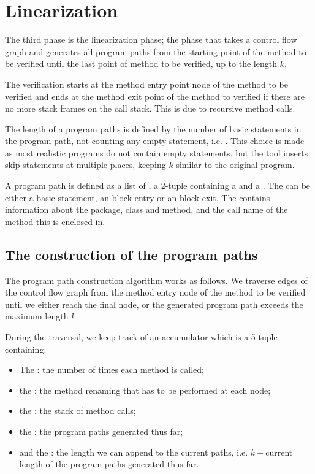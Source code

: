 \section{Linearization}
The third phase is the linearization phase; the phase that takes a control flow 
graph and generates all program paths from the starting point of the method to
be verified until the last point of method to be verified, up to the length $k$.

The verification starts at the method entry point node of the method to be verified
and ends at the method exit point of the method to verified if there are no more 
stack frames on the call stack. This is due to recursive method calls.

The length of a program paths is defined by the number of basic statements in the
program path, not counting any empty statement, i.e. \javainline{;}. This choice
is made as most realistic programs do not contain empty statements, but the tool
inserts skip statements at multiple places, keeping $k$ similar to the original 
program.

A program path is defined as a list of , a 2-tuple 
containing a  and a . The 
 can be either a basic statement, an block entry or an 
block exit. The  contains information about the package,
class and method, and the call name of the method this  is
enclosed in.

\subsection{The construction of the program paths}
The program path construction algorithm works as follows. We traverse edges of
the control flow graph from the method entry node of the method to be verified
until we either reach the final node, or the generated program path exceeds the
maximum length $k$.

During the traversal, we keep track of an accumulator  
which is a 5-tuple containing:

\begin{itemize}
    \item The : the number of times each method is called;
    \item the : the method renaming that has to be
    performed at each node;
    \item the : the stack of method calls;
    \item the : the program paths generated thus far;
    \item and the : the length we can append to the current
    paths, i.e. $k-$current length of the program paths generated thus far. 
\end{itemize}


